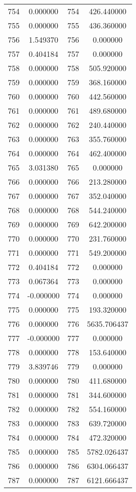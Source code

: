 \documentclass[12pt]{article}
\begin{document}
\begin{longtable}{@{}cccc@{}}
754 & 0.000000 & 754 & 426.440000 \\
755 & 0.000000 & 755 & 436.360000 \\
756 & 1.549370 & 756 & 0.000000 \\
757 & 0.404184 & 757 & 0.000000 \\
758 & 0.000000 & 758 & 505.920000 \\
759 & 0.000000 & 759 & 368.160000 \\
760 & 0.000000 & 760 & 442.560000 \\
761 & 0.000000 & 761 & 489.680000 \\
762 & 0.000000 & 762 & 240.440000 \\
763 & 0.000000 & 763 & 355.760000 \\
764 & 0.000000 & 764 & 462.400000 \\
765 & 3.031380 & 765 & 0.000000 \\
766 & 0.000000 & 766 & 213.280000 \\
767 & 0.000000 & 767 & 352.040000 \\
768 & 0.000000 & 768 & 544.240000 \\
769 & 0.000000 & 769 & 642.200000 \\
770 & 0.000000 & 770 & 231.760000 \\
771 & 0.000000 & 771 & 549.200000 \\
772 & 0.404184 & 772 & 0.000000 \\
773 & 0.067364 & 773 & 0.000000 \\
774 & -0.000000 & 774 & 0.000000 \\
775 & 0.000000 & 775 & 193.320000 \\
776 & 0.000000 & 776 & 5635.706437 \\
777 & -0.000000 & 777 & 0.000000 \\
778 & 0.000000 & 778 & 153.640000 \\
779 & 3.839746 & 779 & 0.000000 \\
780 & 0.000000 & 780 & 411.680000 \\
781 & 0.000000 & 781 & 344.600000 \\
782 & 0.000000 & 782 & 554.160000 \\
783 & 0.000000 & 783 & 639.720000 \\
784 & 0.000000 & 784 & 472.320000 \\
785 & 0.000000 & 785 & 5782.026437 \\
786 & 0.000000 & 786 & 6304.066437 \\
787 & 0.000000 & 787 & 6121.666437 \\

\end{longtable}
\end{document}
